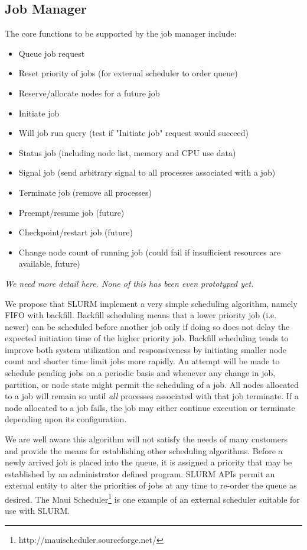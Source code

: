 \subsection{Job Manager}

The core functions to be supported by the job manager include:
\begin{itemize}
\item Queue job request
\item Reset priority of jobs (for external scheduler to order queue)
\item Reserve/allocate nodes for a future job
\item Initiate job
\item Will job run query (test if "Initiate job" request would succeed)
\item Status job (including node list, memory and CPU use data)
\item Signal job (send arbitrary signal to all processes associated with a job)
\item Terminate job (remove all processes)
\item Preempt/resume job  (future)
\item Checkpoint/restart job (future)
\item Change node count of running job (could fail if insufficient resources are 
available, future)
\end{itemize}

{\em We need more detail here. None of this has been even prototyped yet.}

We propose that SLURM implement a very simple scheduling algorithm, namely
FIFO with backfill. Backfill scheduling means that a lower priority job
(i.e. newer) can be scheduled before another job only if doing so does not
delay the expected initiation time of the higher priority job. Backfill
scheduling tends to improve both system utilization and responsiveness by
initiating smaller node count and shorter time limit jobs more rapidly.
An attempt will be made to schedule pending jobs on a periodic basis
and whenever any change in job, partition, or node state might permit
the scheduling of a job.  All nodes allocated to a job will remain so
until {\em all} processes associated with that job terminate.  If a
node allocated to a job fails, the job may either continue execution or
terminate depending upon its configuration.

We are well aware this algorithm will not satisfy the needs of many
customers and provide the means for establishing other scheduling
algorithms. Before a newly arrived job is placed into the queue, it
is assigned a priority that may be established by an administrator
defined program. SLURM APIs permit an external entity to alter the
priorities of jobs at any time to re-order the queue as desired.
The Maui Scheduler\footnote{http://mauischeduler.sourceforge.net/}
is one example of an external scheduler suitable for use with SLURM.

